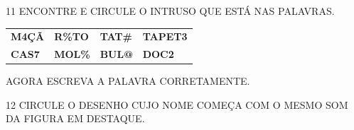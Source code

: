 \begin{escola}
\num{11} ENCONTRE E CIRCULE O INTRUSO QUE ESTÁ NAS PALAVRAS.

\begin{longtable}[]{@{}llll@{}}
\toprule
\textbf{M4ÇÃ} & \textbf{R\%TO} & \textbf{TAT\#} &
\textbf{TAPET3}\tabularnewline
\textbf{CAS7} & \textbf{MOL\%} & \textbf{BUL@} &
\textbf{DOC2}\tabularnewline
\bottomrule
\end{longtable}

AGORA ESCREVA A PALAVRA CORRETAMENTE.


\num{12} CIRCULE O DESENHO CUJO NOME COMEÇA COM O MESMO SOM DA FIGURA EM DESTAQUE.

%
%



\end{escola}
